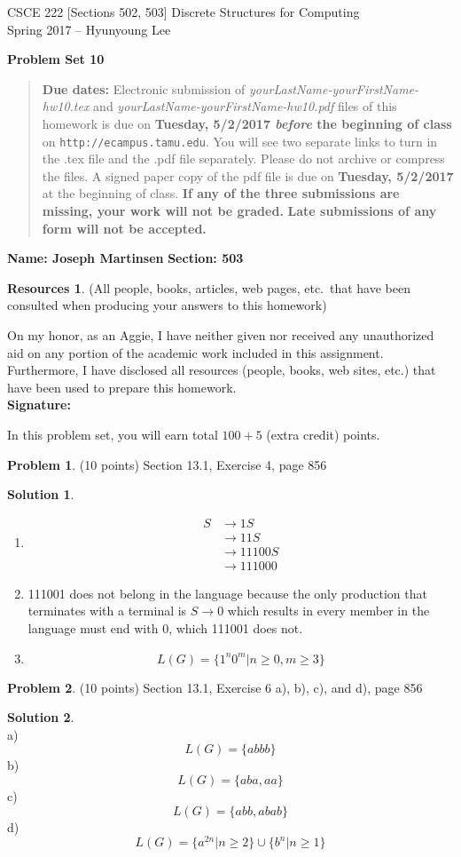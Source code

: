 \documentclass{article}
\theoremstyle{definition}
\newtheorem{problem}{Problem}
\newtheorem*{solution}{Solution}
\newtheorem*{resources}{Resources}
\newcommand{\name}[2]{\noindent\textbf{Name: #1}\hfill \textbf{Section: #2}}
\newcommand{\honor}{\noindent On my honor, as an Aggie, I have neither
  given nor received any unauthorized aid on any portion of the
  academic work included in this assignment. Furthermore, I have
  disclosed all resources (people, books, web sites, etc.) that have
  been used to prepare this homework. \\[2ex]
 \textbf{Signature:} \underline{\hspace*{10cm}} }
\newcommand{\problemset}[1]{\begin{center}\textbf{Problem Set #1}\end{center}}
\newcommand{\duedate}[2]{\begin{quote}\textbf{Due dates:} Electronic
    submission of \textsl{yourLastName-yourFirstName-hw10.tex} and 
    \textsl{yourLastName-yourFirstName-hw10.pdf} files of this homework is due on
    \textbf{#1} on \texttt{http://ecampus.tamu.edu}. You will see two separate links
    to turn in the .tex file and the .pdf file separately. Please do not archive or compress the files.  
    A signed paper copy of the pdf file is due on \textbf{#2} at the beginning of class.
    \textbf{If any of the three submissions are missing, your work will not be graded.}
    \textbf{Late submissions of any form will not be accepted.}\end{quote} }
\begin{document}
\vspace*{-18mm}
\begin{center}
{\large
CSCE 222 [Sections 502, 503] Discrete Structures for Computing\\[.5ex]
Spring 2017 -- Hyunyoung Lee\\}
\end{center}
\problemset{10}
\duedate{Tuesday, 5/2/2017 \textit{before} the beginning of class}{Tuesday, 5/2/2017}
\name{ Joseph Martinsen }{503}
\begin{resources} (All people, books, articles, web pages, etc.\ that
  have been consulted when producing your answers to this homework)
\end{resources}
\honor

\bigskip

\noindent
In this problem set, you will earn total $100+5$ (extra credit) points.

\begin{problem} (10 points)
Section 13.1, Exercise 4, page 856
\end{problem}
\begin{solution} \ \\
  \begin{enumerate}
    \item 
      \begin{align*}
        S &\rightarrow 1S \\
        &\rightarrow 11S \\
        &\rightarrow 11100S \\
        &\rightarrow 111000
      \end{align*}
      
      \item
      111001 does not belong in the language because the only production that
      terminates with a terminal is $S \rightarrow 0$ which results in every member
      in the language must end with 0, which 111001 does not.
      
      \item
      $$L(G) = \{ 1^n 0^m \vert n\ge 0, m \ge 3 \} $$
  \end{enumerate}
\end{solution}

\begin{problem} (10 points)
Section 13.1, Exercise 6 a), b), c), and d), page 856
\end{problem}
\begin{solution} \ \\
a) \\
$$L(G) = \{ abbb \}$$
b) \\
$$L(G) = \{aba, aa \} $$
c) \\
$$L(G) = \{abb, abab \} $$
d) \\
$$L(G) = \{a^{2n} \vert n \ge 2 \} \cup \{b^n \vert n \ge 1 \} $$
\end{solution}
\end{document}
